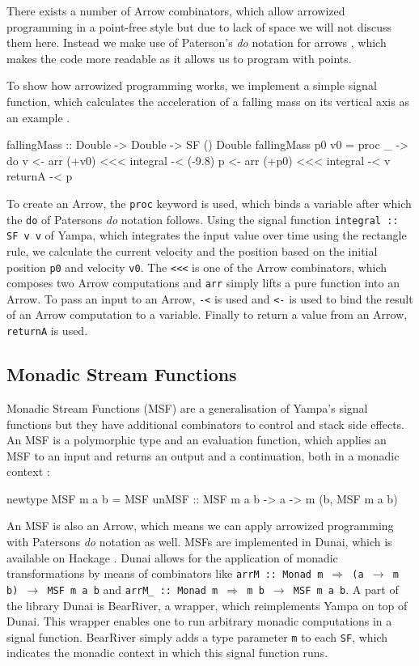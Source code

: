 There exists a number of Arrow combinators, which allow arrowized programming in a point-free style but due to lack of space we will not discuss them here. Instead we make use of Paterson's \textit{do} notation for arrows \cite{paterson_new_2001}, which makes the code more readable as it allows us to program with points.

To show how arrowized programming works, we implement a simple signal function, which calculates the acceleration of a falling mass on its vertical axis as an example \cite{perez_testing_2017}.

\begin{HaskellCode}
fallingMass :: Double -> Double -> SF () Double
fallingMass p0 v0 = proc _ -> do
  v <- arr (+v0) <<< integral -< (-9.8)
  p <- arr (+p0) <<< integral -< v
  returnA -< p
\end{HaskellCode}

To create an Arrow, the \texttt{proc} keyword is used, which binds a variable after which the \texttt{do} of Patersons \textit{do} notation \cite{paterson_new_2001} follows. Using the signal function \texttt{integral :: SF v v} of Yampa, which integrates the input value over time using the rectangle rule, we calculate the current velocity and the position based on the initial position \texttt{p0} and velocity \texttt{v0}. The \texttt{<<<} is one of the Arrow combinators, which composes two Arrow computations and \texttt{arr} simply lifts a pure function into an Arrow. To pass an input to an Arrow, \texttt{-<} is used and \texttt{<-} is used to bind the result of an Arrow computation to a variable. Finally to return a value from an Arrow, \texttt{returnA} is used.

\subsection{Monadic Stream Functions}
\label{sec:back_msf}
Monadic Stream Functions (MSF) are a generalisation of Yampa's signal functions but they have additional combinators to control and stack side effects. An MSF is a polymorphic type and an evaluation function, which applies an MSF to an input and returns an output and a continuation, both in a monadic context \cite{perez_extensible_2017,perez_functional_2016}:
\begin{HaskellCode}
newtype MSF m a b = MSF {unMSF :: MSF m a b -> a -> m (b, MSF m a b)}
\end{HaskellCode}

An MSF is also an Arrow, which means we can apply arrowized programming with Patersons \textit{do} notation as well. MSFs are implemented in Dunai, which is available on Hackage \cite{dunai_library}. Dunai allows for the application of monadic transformations by means of combinators like \texttt{arrM :: Monad m $\Rightarrow$ (a $\rightarrow$ m b) $\rightarrow$ MSF m a b} and \texttt{arrM\_ :: Monad m $\Rightarrow$ m b $\rightarrow$ MSF m a b}. A part of the library Dunai is BearRiver, a wrapper, which reimplements Yampa on top of Dunai. This wrapper enables one to run arbitrary monadic computations in a signal function. BearRiver simply adds a type parameter \texttt{m} to each \texttt{SF}, which indicates the monadic context in which this signal function runs.

